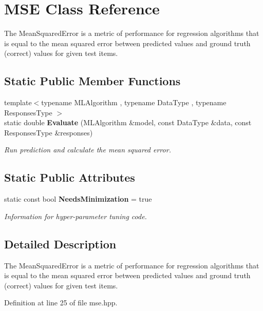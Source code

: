\section{M\+SE Class Reference}
\label{classmlpack_1_1cv_1_1MSE}


The Mean\+Squared\+Error is a metric of performance for regression algorithms that is equal to the mean squared error between predicted values and ground truth (correct) values for given test items.  


\subsection*{Static Public Member Functions}
\begin{DoxyCompactItemize}
\item 
{\footnotesize template$<$typename M\+L\+Algorithm , typename Data\+Type , typename Responses\+Type $>$ }\\static double \textbf{ Evaluate} (M\+L\+Algorithm \&model, const Data\+Type \&data, const Responses\+Type \&responses)
\begin{DoxyCompactList}\small\item\em Run prediction and calculate the mean squared error. \end{DoxyCompactList}\end{DoxyCompactItemize}
\subsection*{Static Public Attributes}
\begin{DoxyCompactItemize}
\item 
static const bool \textbf{ Needs\+Minimization} = true
\begin{DoxyCompactList}\small\item\em Information for hyper-\/parameter tuning code. \end{DoxyCompactList}\end{DoxyCompactItemize}


\subsection{Detailed Description}
The Mean\+Squared\+Error is a metric of performance for regression algorithms that is equal to the mean squared error between predicted values and ground truth (correct) values for given test items. 

Definition at line 25 of file mse.\+hpp.



